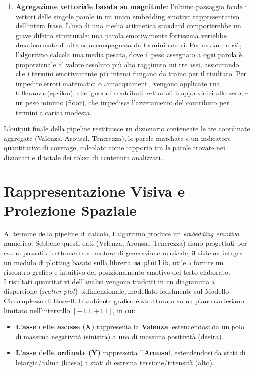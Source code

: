 \begin{enumerate}
\begin{itemize}
        e bersaglio (come "veramente" o "davvero") vengono ignorati, permettendo allo scope del modificatore di persistere intatto. 
    \end{itemize}
    \item \textbf{Agregazione vettoriale basata su magnitude}: l'ultimo passaggio fonde i vettori delle singole parole in un unico embedding emotivo 
    rappresentativo dell'intera frase. L'uso di una media aritmetica standard comporterebbe un grave difetto strutturale: una parola emotivamente 
    fortissima verrebbe drasticamente diluita se accompagnata da termini neutri. Per ovviare a ciò, l'algoritmo calcola una media pesata, 
    dove il peso assegnato a ogni parola è proporzionale al valore assoluto più alto raggiunto sui tre assi, assicurando che i termini emotivamente 
    più intensi fungano da traino per il risultato. Per impedire errori matematici o annacquamenti, vengono applicate una tolleranza (epsilon), 
    che ignora i contributi vettoriali troppo vicini allo zero, e un peso minimo (floor), che impedisce l'azzeramento del contributo per termini a 
    carica modesta.
\end{enumerate}
L'output finale della pipeline restituisce un dizionario contenente le tre coordinate aggregate (Valenza, Arousal, Tenerezza), le parole matchate 
e un indicatore quantitativo di coverage, calcolato come rapporto tra le parole trovate nei dizionari e il totale dei token di contenuto analizzati.

\section{Rappresentazione Visiva e Proiezione Spaziale}
Al termine della pipeline di calcolo, l'algoritmo produce un \textit{embedding emotivo} numerico. Sebbene questi dati (Valenza, Arousal, Tenerezza) 
siano progettati per essere passati direttamente al motore di generazione musicale, il sistema integra un modulo di plotting basato sulla libreria 
\texttt{matplotlib}, utile a fornire un riscontro grafico e intuitivo del posizionamento emotivo del testo elaborato.\\
I risultati quantitativi dell'analisi vengono tradotti in un diagramma a dispersione (\textit{scatter plot}) bidimensionale, modellato fedelmente sul 
Modello Circomplesso di Russell. L'ambiente grafico è strutturato su un piano cartesiano limitato nell'intervallo $[-1.1, +1.1]$, in cui:
\begin{itemize}
    \item \textbf{L'asse delle ascisse (X)} rappresenta la \textbf{Valenza}, estendendosi da un polo di massima negatività (sinistra) a uno di massima 
    positività (destra).
    \item \textbf{L'asse delle ordinate (Y)} rappresenta l'\textbf{Arousal}, estendendosi da stati di letargia/calma (basso) a stati di estrema 
    tensione/intensità (alto). 
\end{itemize}

